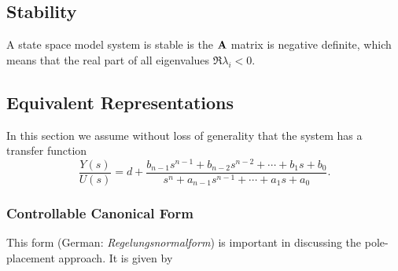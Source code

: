 \subsection{Stability} \label{sec:stability}

A state space model system is stable is the \(\bm{\mathrm{A}}\) matrix is negative definite, which means that the real part of all eigenvalues \(\Re{\lambda_i} < 0\).


\subsection{Equivalent Representations}

In this section we assume without loss of generality that the system has a transfer function
\[
	\frac{Y(s)}{U(s)} = d + \frac{
		b_{n-1} s^{n-1} + b_{n-2} s^{n-2} + \cdots + b_1 s + b_0
	}{
		s^n + a_{n-1} s^{n-1} + \cdots + a_1 s + a_0
	}.
\]

\subsubsection{Controllable Canonical Form}

This form (German: \textsl{Regelungsnormalform}) is important in discussing the pole-placement approach. It is given by

